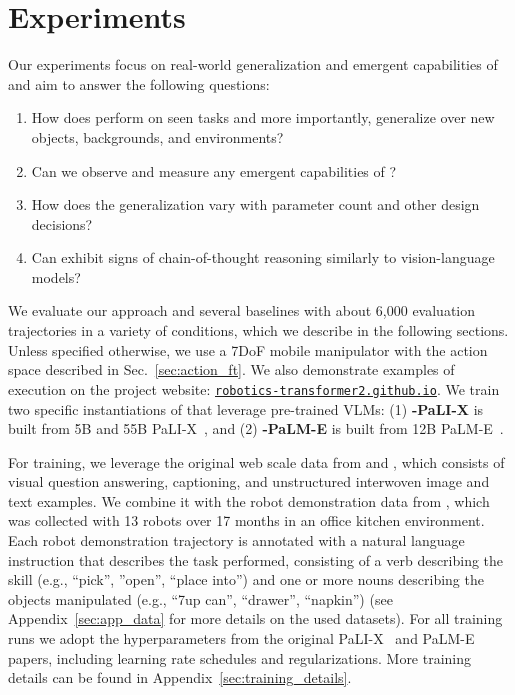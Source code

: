\section{Experiments}
\label{sec:exp}

Our experiments focus on real-world generalization and emergent capabilities of \methodname and aim to answer the following questions:
\begin{enumerate}
\itemsep0em 
\item How does \methodname perform on seen tasks and more importantly, generalize over new objects, backgrounds, and environments? 
\item Can we observe and measure any emergent capabilities of \methodname?
\item How does the generalization vary with parameter count and other design decisions? 
\item Can \methodname exhibit signs of chain-of-thought reasoning similarly to vision-language models?
\end{enumerate}
We evaluate our approach and several baselines with about 6,000 evaluation trajectories in a variety of conditions, which we describe in the following sections. 
Unless specified otherwise, we use a 7DoF mobile manipulator with the action space described in Sec.~\ref{sec:action_ft}.
We also demonstrate examples of \methodname execution on the project website: \texttt{\href{https://robotics-transformer2.github.io/}{robotics-transformer2.github.io}}. We train two specific instantiations of \methodname that leverage pre-trained VLMs: (1) \textbf{\methodname-PaLI-X} is built from 5B and 55B PaLI-X~\citep{chen2023palix}, and (2) \textbf{\methodname-PaLM-E} is built from 12B PaLM-E~\citep{driess2023palm}.

For training, we leverage the original web scale data from \citet{chen2023palix} and \citet{driess2023palm}, which consists of visual question answering, captioning, and unstructured interwoven image and text examples. We combine it with the robot demonstration data from \citet{brohan2022rt}, which was collected with 13 robots over 17 months in an office kitchen environment.
Each robot demonstration trajectory is annotated with a natural language instruction that describes the task performed, consisting of a verb describing the skill (e.g., ``pick'', ''open'', ``place into'') and one or more nouns describing the objects manipulated (e.g., ``7up can'', ``drawer'', ``napkin'') (see Appendix~\ref{sec:app_data} for more details on the used datasets). For all \methodname training runs we adopt the hyperparameters from the original PaLI-X~\citep{chen2023palix} and PaLM-E~\citep{driess2023palm} papers, including learning rate schedules and regularizations. More training details can be found in Appendix~\ref{sec:training_details}.

